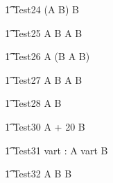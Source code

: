 \begin{circusaction}
   \t1 Test24 \circdef  (A \circseq B) \circtimeout {} \rcirctime B \\
\end{circusaction}

\begin{circusaction}
   \t1 Test25 \circdef  A \circseq B \circtimeout {} \rcirctime  A \circseq B \\
\end{circusaction}

\begin{circusaction}
   \t1 Test26 \circdef  A \circseq (B \circtimeout {} \rcirctime A \circseq B)\\
\end{circusaction}

\begin{circusaction}
   \t1 Test27 \circdef  A \circtimeout {} \rcirctime B \circtimeout {} \rcirctime A \circseq B\\
\end{circusaction}


\begin{circusaction}
   \t1 Test28 \circdef  A \circtimedinterrupt {} \rcirctime B  \\
\end{circusaction}


\begin{circusaction}
   \t1 Test30 \circdef  A \circtimedinterrupt {} + 20 \rcirctime B  \\
\end{circusaction}

\begin{circusaction}
   \t1 Test31 \circdef \circvres vart : \nat  \circspot  A \circtimedinterrupt \lcirctime vart \rcirctime B \\
\end{circusaction}


\begin{circusaction}
   \t1 Test32 \circdef  A \circseq B \circtimedinterrupt {} \rcirctime B  \\
\end{circusaction}


